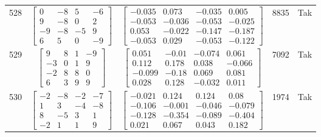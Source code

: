 \documentclass[a4paper,12pt]{article}
\begin{document}
\begin{tabular}{c c c c c}
528
&
$\begin{bmatrix} 0 & -8 & 5 & -6 \\ 9 & -8 & 0 & 2 \\ -9 & -8 & -5 & 9 \\ 6 & 5 & 0 & -9 \end{bmatrix}$
&
$\begin{bmatrix} -0.035 & 0.073 & -0.035 & 0.005 \\ -0.053 & -0.036 & -0.053 & -0.025 \\ 0.053 & -0.022 & -0.147 & -0.187 \\ -0.053 & 0.029 & -0.053 & -0.122 \end{bmatrix}$
&
8835
&
Tak
\\
529
&
$\begin{bmatrix} 9 & 8 & 1 & -9 \\ -3 & 0 & 1 & 9 \\ -2 & 8 & 8 & 0 \\ 6 & 3 & 9 & 9 \end{bmatrix}$
&
$\begin{bmatrix} 0.051 & -0.01 & -0.074 & 0.061 \\ 0.112 & 0.178 & 0.038 & -0.066 \\ -0.099 & -0.18 & 0.069 & 0.081 \\ 0.028 & 0.128 & -0.032 & 0.011 \end{bmatrix}$
&
7092
&
Tak
\\
530
&
$\begin{bmatrix} -2 & -8 & -2 & -7 \\ 1 & 3 & -4 & -8 \\ 8 & -5 & 3 & 1 \\ -2 & 1 & 1 & 9 \end{bmatrix}$
&
$\begin{bmatrix} -0.021 & 0.124 & 0.124 & 0.08 \\ -0.106 & -0.001 & -0.046 & -0.079 \\ -0.128 & -0.354 & -0.089 & -0.404 \\ 0.021 & 0.067 & 0.043 & 0.182 \end{bmatrix}$
&
1974
&
Tak
\\
\end{tabular} \egroup \newpage
\end{document}
